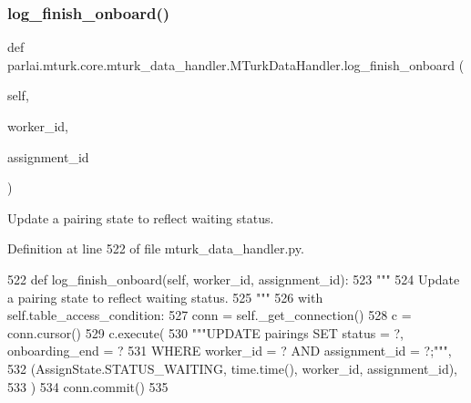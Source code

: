 \subsubsection{\texorpdfstring{log\+\_\+finish\+\_\+onboard()}{log\_finish\_onboard()}}
{\footnotesize\ttfamily def parlai.\+mturk.\+core.\+mturk\+\_\+data\+\_\+handler.\+M\+Turk\+Data\+Handler.\+log\+\_\+finish\+\_\+onboard (\begin{DoxyParamCaption}\item[{}]{self,  }\item[{}]{worker\+\_\+id,  }\item[{}]{assignment\+\_\+id }\end{DoxyParamCaption})}

\begin{DoxyVerb}Update a pairing state to reflect waiting status.
\end{DoxyVerb}
 

Definition at line 522 of file mturk\+\_\+data\+\_\+handler.\+py.


\begin{DoxyCode}
522     \textcolor{keyword}{def }log\_finish\_onboard(self, worker\_id, assignment\_id):
523         \textcolor{stringliteral}{"""}
524 \textcolor{stringliteral}{        Update a pairing state to reflect waiting status.}
525 \textcolor{stringliteral}{        """}
526         with self.table\_access\_condition:
527             conn = self.\_get\_connection()
528             c = conn.cursor()
529             c.execute(
530                 \textcolor{stringliteral}{"""UPDATE pairings SET status = ?, onboarding\_end = ?}
531 \textcolor{stringliteral}{                         WHERE worker\_id = ? AND assignment\_id = ?;"""},
532                 (AssignState.STATUS\_WAITING, time.time(), worker\_id, assignment\_id),
533             )
534             conn.commit()
535 
\end{DoxyCode}
\mbox{\label{classparlai_1_1mturk_1_1core_1_1mturk__data__handler_1_1MTurkDataHandler_acfa910fb6805c19a8693b7688f1fb133}} 
